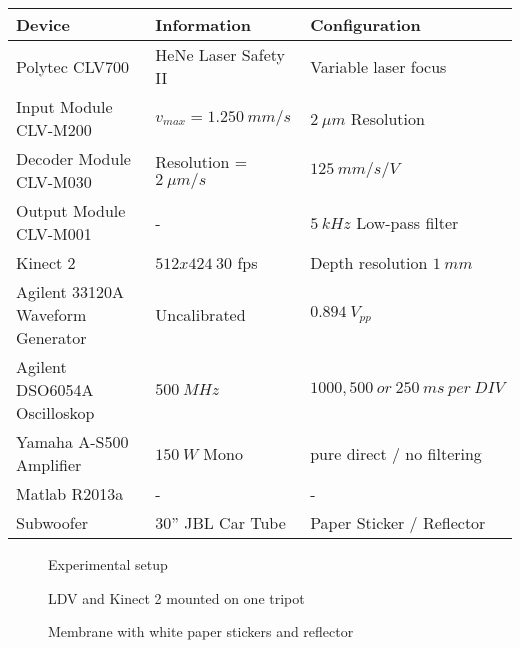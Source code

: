 \begin{center}
	\begin{tabular}{| l | l | l |}
		\hline
		\textbf{Device} & \textbf{Information} & \textbf{Configuration} \\ \hline
		Polytec CLV700 & HeNe Laser Safety II  & Variable laser focus   \\ \hline
		Input Module CLV-M200 & $v_{max}=1.250~mm/s$ & $2~\mu m$ Resolution  \\ \hline
		Decoder Module CLV-M030 & Resolution = $ 2~\mu m/s$ & $125~mm/s/V$  \\ \hline
		Output Module CLV-M001 & - & $5~kHz$ Low-pass filter \\ \hline
		Kinect 2 & $512x424~30$ fps & Depth resolution $1~mm$ \\ \hline
		Agilent 33120A Waveform Generator  & Uncalibrated & $0.894~V_{pp}$ \\ \hline
		Agilent DSO6054A Oscilloskop & $500~MHz$ & $1000, 500~or~250~ms~per~DIV$ \\ \hline
		Yamaha A-S500 Amplifier & $150~W$ Mono & pure direct / no filtering \\ \hline
		Matlab R2013a & - & - \\ \hline
		Subwoofer & 30'' JBL Car Tube & Paper Sticker / Reflector \\
		\hline 
	\end{tabular} 	
\end{center}

\begin{figure}[!h]
	\centering
	\caption{Experimental setup}
	\label{fig:ToF_LDV_Team}
\end{figure} 

\newpage
\begin{figure}[!h]
	\centering
	\caption{LDV and Kinect 2 mounted on one tripot}
	\label{fig:ToF_LDV_Team}
\end{figure} 

\begin{figure}[!h]
	\centering
	\caption{Membrane with white paper stickers and reflector}
	\label{fig:membrane}
\end{figure} 

\newpage

